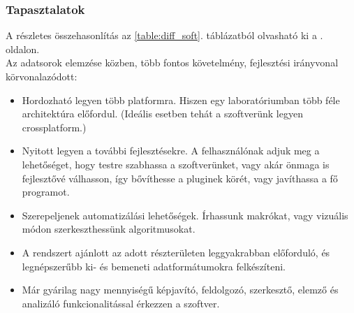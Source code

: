\documentclass[a4paper,12pt,oneside]{report}
\begin{document}
\subsubsection{Tapasztalatok}
A részletes összehasonlítás az \ref{table:diff_soft}. táblázatból olvasható ki a \pageref{table:diff_soft}. oldalon.\\

Az adatsorok elemzése közben, több fontos követelmény, fejlesztési irányvonal körvonalazódott:
\begin{itemize}
	\itemsep0em
	\item Hordozható legyen több platformra. Hiszen egy laboratóriumban több féle architektúra előfordul. (Ideális esetben tehát a szoftverünk legyen crossplatform.)
	\item Nyitott legyen a további fejlesztésekre. A felhasználónak adjuk meg a lehetőséget, hogy testre szabhassa a szoftverünket, vagy akár önmaga is fejlesztővé válhasson, így bővíthesse a pluginek körét, vagy javíthassa a fő programot.

	\item Szerepeljenek automatizálási lehetőségek. Írhassunk makrókat, vagy vizuális módon szerkeszthessünk algoritmusokat.
	\item A rendszert ajánlott az adott részterületen leggyakrabban előforduló, és legnépszerűbb ki- és  bemeneti adatformátumokra felkészíteni.
	\item Már gyárilag nagy mennyiségű képjavító, feldolgozó, szerkesztő, elemző és analizáló funkcionalitással érkezzen a szoftver.

\end{itemize}
\end{document}
